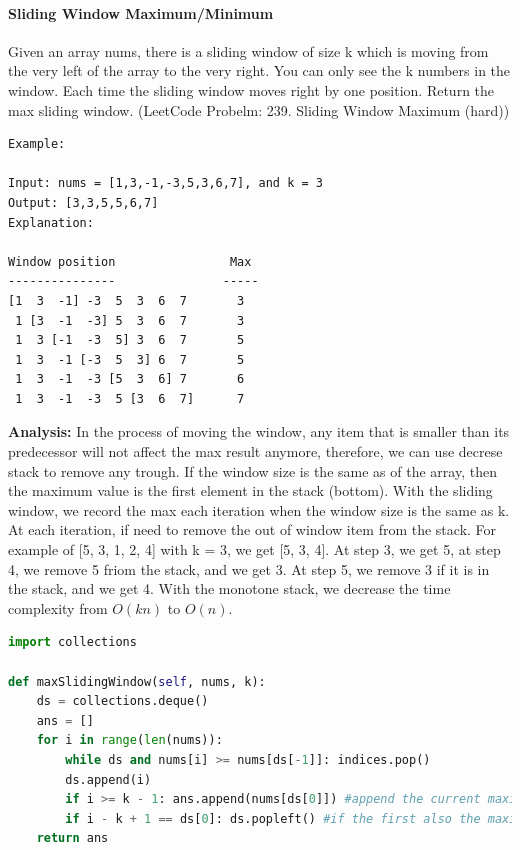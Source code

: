 \documentclass[../main.tex]{subfiles}
\begin{document}
\paragraph{Sliding Window Maximum/Minimum } Given an array nums, there is a sliding window of size k which is moving from the very left of the array to the very right. You can only see the k numbers in the window. Each time the sliding window moves right by one position. Return the max sliding window. (LeetCode Probelm: 239. Sliding Window Maximum (hard))
\begin{lstlisting}[numbers=none]
Example:

Input: nums = [1,3,-1,-3,5,3,6,7], and k = 3
Output: [3,3,5,5,6,7] 
Explanation: 

Window position                Max
---------------               -----
[1  3  -1] -3  5  3  6  7       3
 1 [3  -1  -3] 5  3  6  7       3
 1  3 [-1  -3  5] 3  6  7       5
 1  3  -1 [-3  5  3] 6  7       5
 1  3  -1  -3 [5  3  6] 7       6
 1  3  -1  -3  5 [3  6  7]      7
\end{lstlisting}

\textbf{Analysis:} In the process of moving the window, any item that is smaller than its predecessor will not affect the max result anymore, therefore, we can use decrese stack to remove any trough. If the window size is the same as of the array, then the maximum value is the first element in the stack (bottom). With the sliding window, we record the max each iteration when the window size is the same as k. At each iteration, if need to remove the out of window item from the stack. For example of [5, 3, 1, 2, 4] with k = 3, we get [5, 3, 4]. At step 3, we get 5, at step 4, we remove 5 friom the stack, and we get 3. At step 5, we remove 3 if it is in the stack, and we get 4. With the monotone stack, we decrease the time complexity from $O(kn)$ to $O(n)$.
\begin{lstlisting}[language=Python]
import collections

def maxSlidingWindow(self, nums, k):
    ds = collections.deque()
    ans = []
    for i in range(len(nums)):
        while ds and nums[i] >= nums[ds[-1]]: indices.pop()
        ds.append(i)
        if i >= k - 1: ans.append(nums[ds[0]]) #append the current maximum
        if i - k + 1 == ds[0]: ds.popleft() #if the first also the maximum number is out of window, pop it out
    return ans
\end{lstlisting}
\end{document}
